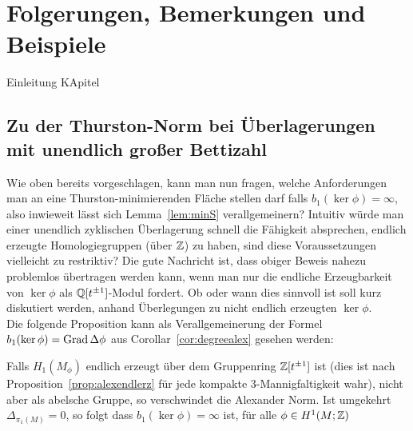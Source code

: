 
\section{Folgerungen, Bemerkungen und Beispiele}
    Einleitung KApitel

    \subsection{Zu der Thurston-Norm bei Überlagerungen mit unendlich großer Bettizahl}
        
    \label{verallggruppenring}
    Wie oben bereits vorgeschlagen, kann man nun fragen, welche Anforderungen man an eine Thurston-minimierenden Fläche stellen darf falls $b_1(\ker\phi)=\infty$, also inwieweit lässt sich Lemma~\ref{lem:minS} verallgemeinern? Intuitiv würde man einer unendlich zyklischen Überlagerung schnell die Fähigkeit absprechen, endlich erzeugte Homologiegruppen (über $\mathbb{Z}$) zu haben, sind diese Voraussetzungen vielleicht zu restriktiv? Die gute Nachricht ist, dass obiger Beweis nahezu problemlos übertragen werden kann, wenn man nur die endliche Erzeugbarkeit von $\ker\phi$ als $\mathbb{Q}[t^{\pm 1}]$-Modul fordert. Ob oder wann dies sinnvoll ist soll kurz diskutiert werden, anhand Überlegungen zu nicht endlich erzeugten $\ker\phi$.\\
    Die folgende Proposition kann als Verallgemeinerung der Formel $b_1(\ker\phi)=\operatorname{Grad}\Delta\phi$ aus Corollar~\ref{cor:degreealex} gesehen werden:
    \begin{prop}
    	Falls $H_1(M_\phi)$ endlich erzeugt über dem Gruppenring $\mathbb{Z}[t^{\pm 1}]$ ist (dies ist nach Proposition~\ref{prop:alexendlerz} für jede kompakte 3-Mannigfaltigkeit wahr), nicht aber als abelsche Gruppe, so verschwindet die Alexander Norm. Ist umgekehrt $\Delta_{\pi_1(M)}=0$, so folgt dass $b_1(\ker\phi)=\infty$ ist, für alle $\phi\in H^1(M;\mathbb{Z})$
    \end{prop}
